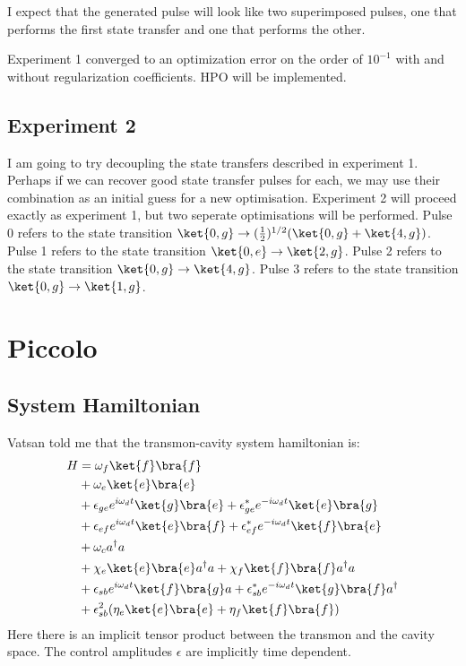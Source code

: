 \documentclass[letterpaper, 12pt]{article}
\begin{document}
I expect that the generated pulse will look like two superimposed pulses, one that performs the first state transfer and one that performs the other.

Experiment 1 converged to an optimization error on the order of $10^{-1}$ with and without regularization coefficients. HPO will be implemented.

\subsection{Experiment 2}
I am going to try decoupling the state transfers described in experiment 1. Perhaps if we can recover good state transfer pulses for each, we may use their combination as an initial guess for a new optimisation. Experiment 2 will proceed exactly as experiment 1, but two seperate optimisations will be performed. Pulse 0 refers to the state transition $\ket{0, g} \rightarrow (\frac{1}{2})^{1/2} (\ket{0, g} + \ket{4, g})$. Pulse 1 refers to the state transition $\ket{0, e} \rightarrow \ket{2, g}$. Pulse 2 refers to the state transition $\ket{0, g} \rightarrow \ket{4, g}$. Pulse 3 refers to the state transition $\ket{0, g} \rightarrow \ket{1, g}$.

\section{Piccolo}
\subsection{System Hamiltonian}
Vatsan told me that the transmon-cavity system hamiltonian is:
\begin{align*}
  H &= \omega_{f}\ket{f}\bra{f} \\
  &+ \omega_{e}\ket{e}\bra{e}\\
  &+ \epsilon_{ge}e^{i\omega_{d}t}\ket{g}\bra{e} + \epsilon_{ge}^{*}e^{-i\omega_{d}t}\ket{e}\bra{g}\\
  &+ \epsilon_{ef}e^{i\omega_{d}t}\ket{e}\bra{f} + \epsilon_{ef}^{*}e^{-i\omega_{d}t}\ket{f}\bra{e}\\
  &+ \omega_{c}a^{\dagger}a\\
  &+ \chi_{e}\ket{e}\bra{e}a^{\dagger}a + \chi_{f}\ket{f}\bra{f}a^{\dagger}a\\
  &+ \epsilon_{sb}e^{i\omega_{d}t}\ket{f}\bra{g}a + \epsilon_{sb}^{*}e^{-i\omega_{d}t}\ket{g}\bra{f}a^{\dagger}\\
  &+ \epsilon_{sb}^{2}(\eta_{e}\ket{e}\bra{e} + \eta_{f}\ket{f}\bra{f})\\
\end{align*}
Here there is an implicit tensor product between the transmon and the cavity space. The control amplitudes $\epsilon$ are implicitly time dependent.
\end{document}

